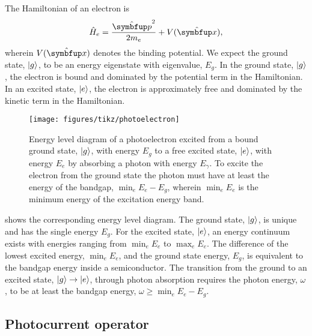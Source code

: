 The Hamiltonian of an electron is
\begin{equation}
	\hat{H}_e
	=
	\frac{\vu{p}^2}{2m_e}
	+
	V(\vu{x})
	,
\end{equation}
wherein $V(\vu{x})$ denotes the binding potential.
We expect the ground state, $\lvert g\rangle$, to be an energy eigenstate with eigenvalue, $E_g$.
In the ground state, $\lvert g\rangle$, the electron is bound and dominated by the potential term in the Hamiltonian.
In an excited state, $\lvert e\rangle$, the electron is approximately free and dominated by the kinetic term in the Hamiltonian.
\begin{figure}[htb]
    \centering
    \texttt{[image: figures/tikz/photoelectron]}
    \caption{Energy level diagram of a photoelectron excited from a bound ground state, $\lvert g\rangle$, with energy $E_g$ to a free excited state, $\lvert e\rangle$, with energy $E_e$ by absorbing a photon with energy $E_\gamma$. To excite the electron from the ground state the photon must have at least the energy of the bandgap, $\min_eE_e-E_g$, wherein $\min_eE_e$ is the minimum energy of the excitation energy band.}\label{fig:photoelectron}
\end{figure}
 shows the corresponding energy level diagram.
The ground state, $\lvert g\rangle$, is unique and has the single energy $E_g$.
For the excited state, $\lvert e\rangle$, an energy continuum exists with energies ranging from $\min_eE_e$ to $\max_eE_e$.
The difference of the lowest excited energy, $\min_eE_e$, and the ground state energy, $E_g$, is equivalent to the bandgap energy inside a semiconductor.
The transition from the ground to an excited state, $\lvert g\rangle\to\lvert e\rangle$, through photon absorption requires the photon energy, $\omega$, to be at least the bandgap energy, $\omega\geq\min_eE_e-E_g$.

\FloatBarrier
\subsection{Photocurrent operator}


